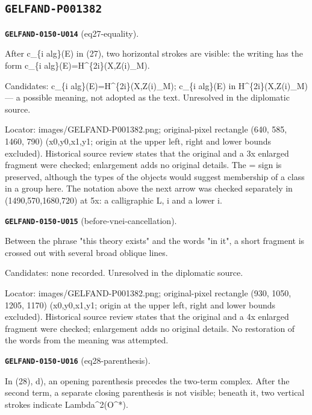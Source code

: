 \documentclass[11pt]{article}
\theoremstyle{definition}
\theoremstyle{remark}
\begin{document}
\subsection*{\texttt{GELFAND-P001382}}
\noindent\leavevmode{}\label{GELFAND-P001382:eq27-equality:note}\textbf{\texttt{GELFAND-0150-U014}} (eq27-equality).\par\nopagebreak[4]
After c\_\{i alg\}(E) in (27), two horizontal strokes are visible: the writing has the form c\_\{i alg\}(E)=H\textasciicircum{}\{2i\}(X,Z(i)\_M).\par
Candidates: c\_\{i alg\}(E)=H\textasciicircum{}\{2i\}(X,Z(i)\_M); c\_\{i alg\}(E) in H\textasciicircum{}\{2i\}(X,Z(i)\_M) --- a possible meaning, not adopted as the text. Unresolved in the diplomatic source.\par
Locator: images/GELFAND-P001382.png; original-pixel rectangle (640, 585, 1460, 790) (x0,y0,x1,y1; origin at the upper left, right and lower bounds excluded). Historical source review states that the original and a 3x enlarged fragment were checked; enlargement adds no original details. The = sign is preserved, although the types of the objects would suggest membership of a class in a group here. The notation above the next arrow was checked separately in (1490,570,1680,720) at 5x: a calligraphic L, i and a lower i.\par\medskip
\noindent\leavevmode{}\label{GELFAND-P001382:before-vnei-cancellation:note}\textbf{\texttt{GELFAND-0150-U015}} (before-vnei-cancellation).\par\nopagebreak[4]
Between the phrase "this theory exists" and the words "in it", a short fragment is crossed out with several broad oblique lines.\par
Candidates: none recorded. Unresolved in the diplomatic source.\par
Locator: images/GELFAND-P001382.png; original-pixel rectangle (930, 1050, 1205, 1170) (x0,y0,x1,y1; origin at the upper left, right and lower bounds excluded). Historical source review states that the original and a 4x enlarged fragment were checked; enlargement adds no original details. No restoration of the words from the meaning was attempted.\par\medskip
\noindent\leavevmode{}\label{GELFAND-P001382:eq28-parenthesis:note}\textbf{\texttt{GELFAND-0150-U016}} (eq28-parenthesis).\par\nopagebreak[4]
In (28), d), an opening parenthesis precedes the two-term complex. After the second term, a separate closing parenthesis is not visible; beneath it, two vertical strokes indicate Lambda\textasciicircum{}2(O\textasciicircum{}*).\par
\end{document}
